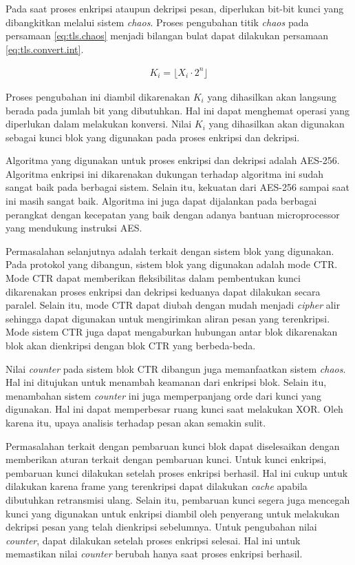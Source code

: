 Pada saat proses enkripsi ataupun dekripsi pesan, diperlukan bit-bit kunci yang dibangkitkan melalui sistem \emph{chaos}. Proses pengubahan titik \emph{chaos} pada persamaan \ref{eq:tls.chaos} menjadi bilangan bulat dapat dilakukan persamaan \ref{eq:tls.convert.int}.

\begin{equation}
  \begin{aligned}
    K_i = \lfloor{X_i \cdot 2^{n}}\rfloor
  \end{aligned}
  \label{eq:tls.convert.int}
\end{equation}

Proses pengubahan ini diambil dikarenakan $K_i$ yang dihasilkan akan langsung berada pada jumlah bit yang dibutuhkan. Hal ini dapat menghemat operasi yang diperlukan dalam melakukan konversi. Nilai $K_i$ yang dihasilkan akan digunakan sebagai kunci blok yang digunakan pada proses enkripsi dan dekripsi.

Algoritma yang digunakan untuk proses enkripsi dan dekripsi adalah AES-256. Algoritma enkripsi ini dikarenakan dukungan terhadap algoritma ini sudah sangat baik pada berbagai sistem. Selain itu, kekuatan dari AES-256 sampai saat ini masih sangat baik. Algoritma ini juga dapat dijalankan pada berbagai perangkat dengan kecepatan yang baik dengan adanya bantuan microprocessor yang mendukung instruksi AES.

Permasalahan selanjutnya adalah terkait dengan sistem blok yang digunakan. Pada protokol yang dibangun, sistem blok yang digunakan adalah mode CTR. Mode CTR dapat memberikan fleksibilitas dalam pembentukan kunci dikarenakan proses enkripsi dan dekripsi keduanya dapat dilakukan secara paralel. Selain itu, mode CTR dapat diubah dengan mudah menjadi \emph{cipher} alir sehingga dapat digunakan untuk mengirimkan aliran pesan yang terenkripsi. Mode sistem CTR juga dapat mengaburkan hubungan antar blok dikarenakan blok akan dienkripsi dengan blok CTR yang berbeda-beda.

Nilai \emph{counter} pada sistem blok CTR dibangun juga memanfaatkan sistem \emph{chaos}. Hal ini ditujukan untuk menambah keamanan dari enkripsi blok. Selain itu, menambahan sistem \emph{counter} ini juga memperpanjang orde dari kunci yang digunakan. Hal ini dapat memperbesar ruang kunci saat melakukan XOR. Oleh karena itu, upaya analisis terhadap pesan akan semakin sulit.

Permasalahan terkait dengan pembaruan kunci blok dapat diselesaikan dengan memberikan aturan terkait dengan pembaruan kunci. Untuk kunci enkripsi, pembaruan kunci dilakukan setelah proses enkripsi berhasil. Hal ini cukup untuk dilakukan karena frame yang terenkripsi dapat dilakukan \emph{cache} apabila dibutuhkan retransmisi ulang. Selain itu, pembaruan kunci segera juga mencegah kunci yang digunakan untuk enkripsi diambil oleh penyerang untuk melakukan dekripsi pesan yang telah dienkripsi sebelumnya. Untuk pengubahan nilai \emph{counter}, dapat dilakukan setelah proses enkripsi selesai. Hal ini untuk memastikan nilai \emph{counter} berubah hanya saat proses enkripsi berhasil. 

